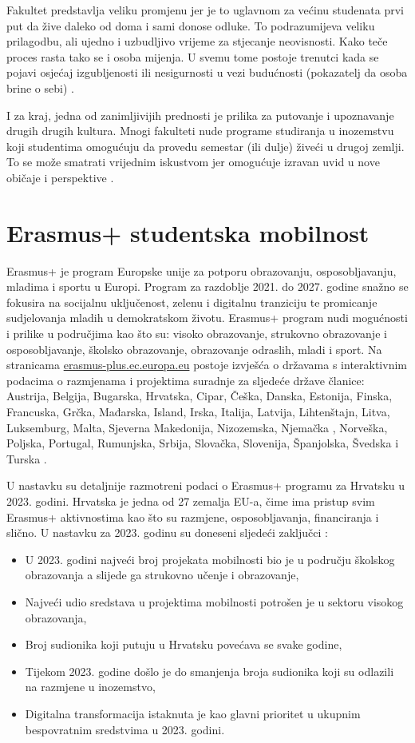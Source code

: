 \documentclass[]{foi}
\begin{document}
Fakultet predstavlja veliku promjenu jer je to uglavnom za većinu studenata prvi put da žive daleko od doma i sami donose odluke. To podrazumijeva veliku prilagodbu, ali ujedno i uzbudljivo vrijeme
za stjecanje neovisnosti. Kako teče proces rasta tako se i osoba mijenja. U svemu tome postoje trenutci kada se pojavi osjećaj izgubljenosti ili nesigurnosti u vezi budućnosti (pokazatelj
da osoba brine o sebi) \cite{bisio2025college}. 

I za kraj, jedna od zanimljivijih prednosti je prilika za putovanje i upoznavanje drugih drugih kultura. Mnogi fakulteti nude programe studiranja u inozemstvu koji studentima omogućuju da provedu 
semestar (ili dulje) živeći u drugoj zemlji. To se može smatrati vrijednim iskustvom jer omogućuje izravan uvid u nove običaje i perspektive \cite{bisio2025college}.

\section{Erasmus+ studentska mobilnost}
Erasmus+ je program Europske unije za potporu obrazovanju, osposobljavanju, mladima i sportu u Europi. Program za razdoblje 2021. do 2027. godine snažno se fokusira na socijalnu uključenost,
zelenu i digitalnu tranziciju te promicanje sudjelovanja mladih u demokratskom životu. Erasmus+ program nudi mogućnosti i prilike u područjima kao što su: visoko obrazovanje, strukovno obrazovanje i osposobljavanje,
školsko obrazovanje, obrazovanje odraslih, mladi i sport. 
Na stranicama \underline{erasmus-plus.ec.europa.eu} postoje izvješća o državama s interaktivnim podacima o razmjenama i projektima suradnje za sljedeće države članice:
Austrija, Belgija, Bugarska, Hrvatska, Cipar, Češka, Danska, Estonija, Finska, Francuska, Grčka, Mađarska, Island, Irska, Italija, Latvija, Lihtenštajn, Litva, 
Luksemburg, Malta, Sjeverna Makedonija, Nizozemska, Njemačka , Norveška, Poljska, Portugal, Rumunjska, Srbija, Slovačka, Slovenija, Španjolska, Švedska i Turska \cite{erasmus2025}.

U nastavku su detaljnije razmotreni podaci o Erasmus+ programu za Hrvatsku u 2023. godini. Hrvatska je jedna od 27 zemalja EU-a, čime ima pristup svim Erasmus+ 
aktivnostima kao što su razmjene, osposobljavanja, financiranja i slično. U nastavku za 2023. godinu su doneseni sljedeći zaključci \cite{erasmus2023croatia}:
\begin{itemize}
    \item U 2023. godini najveći broj projekata mobilnosti bio je u području školskog obrazovanja a slijede ga strukovno učenje i obrazovanje,
    \item Najveći udio sredstava u projektima mobilnosti potrošen je u sektoru visokog obrazovanja,
    \item Broj sudionika koji putuju u Hrvatsku povećava se svake godine,
    \item Tijekom 2023. godine došlo je do smanjenja broja sudionika koji su odlazili na razmjene u inozemstvo,
    \item Digitalna transformacija istaknuta je kao glavni prioritet u ukupnim bespovratnim sredstvima u 2023. godini. 
\end{itemize}
\end{document}
